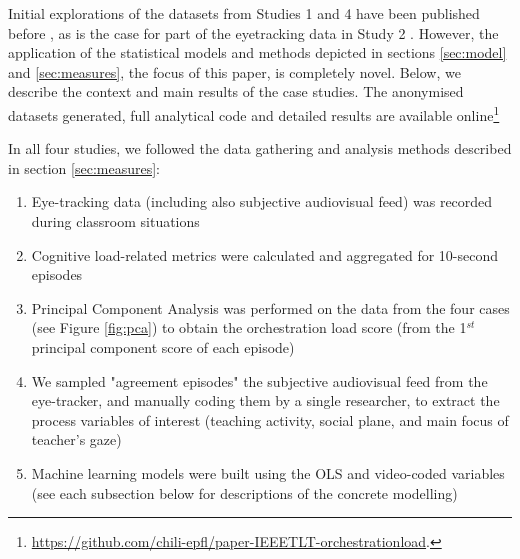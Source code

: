 \documentclass[10pt,journal,compsoc]{IEEEtran}
\begin{document}
Initial explorations of the datasets from Studies 1 and 4 have been published before \cite{Prieto2015cscl}, as is the case for part of the eyetracking data in Study 2 \cite{Prieto2015ectel}. However, the application of the statistical models and methods depicted in sections \ref{sec:model} and \ref{sec:measures}, the focus of this paper, is completely novel. Below, we describe the context and main results of the case studies. The anonymised datasets generated, full analytical code and detailed results are available online\footnote{\href{https://github.com/chili-epfl/paper-IEEETLT-orchestrationload}{https://github.com/chili-epfl/paper-IEEETLT-orchestrationload}.}

In all four studies, we followed the data gathering and analysis methods described in section \ref{sec:measures}:

\begin{enumerate}
\item Eye-tracking data (including also subjective audiovisual feed) was recorded during classroom situations
\item Cognitive load-related metrics were calculated and aggregated for 10-second episodes
\item Principal Component Analysis was performed on the data from the four cases (see Figure \ref{fig:pca}) to obtain the orchestration load score (from the 1$^{st}$ principal component score of each episode)
\item We sampled "agreement episodes" the subjective audiovisual feed from the eye-tracker, and manually coding them by a single researcher, to extract the process variables of interest (teaching activity, social plane, and main focus of teacher's gaze)
\item Machine learning models were built using the OLS and video-coded variables (see each subsection below for descriptions of the concrete modelling)
\end{enumerate}
\end{document}
